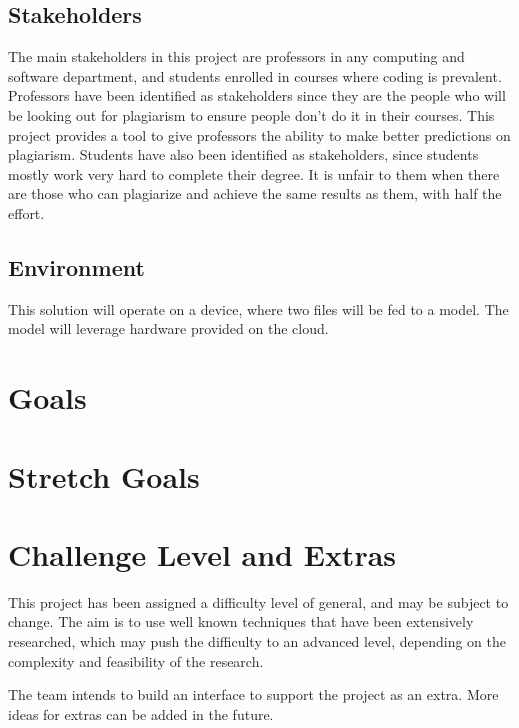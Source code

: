 \documentclass{article}
\begin{document}

\subsection{Stakeholders}
The main stakeholders in this project are professors in any computing and software department, and students enrolled in courses where coding is prevalent. Professors have been identified as stakeholders since they are the people who will be looking out for plagiarism to ensure people don't do it in their courses. This project provides a tool to give professors the ability to make better predictions on plagiarism. Students have also been identified as stakeholders, since students mostly work very hard to complete their degree. It is unfair to them when there are those who can plagiarize and achieve the same results as them, with half the effort.

\subsection{Environment}
This solution will operate on a device, where two files will be fed to a model. The model will leverage hardware provided on the cloud.



\section{Goals}

\section{Stretch Goals}

\section{Challenge Level and Extras}
This project has been assigned a difficulty level of general, and may be subject to change. The aim is to use well known techniques that have been extensively researched, which may push the difficulty to an advanced level, depending on the complexity and feasibility of the research. 


The team intends to build an interface to support the project as an extra. More ideas for extras can be added in the future.
\end{document}
